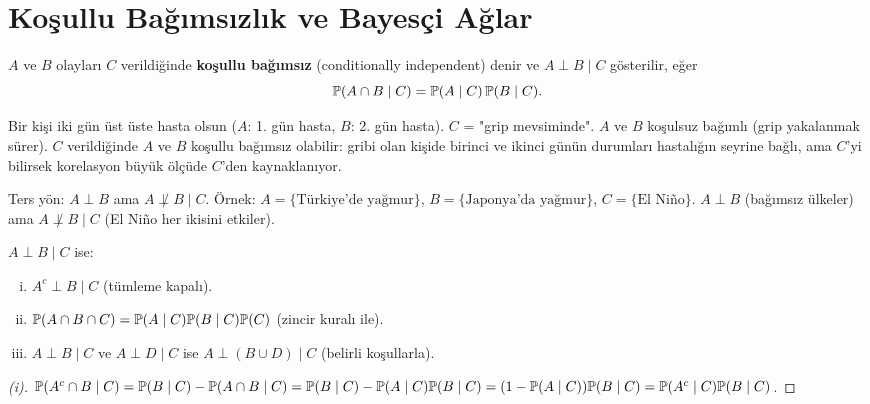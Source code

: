 \section{Koşullu Bağımsızlık ve Bayesçi Ağlar}
\label{sec:kosullu_bagimsizlik}

\begin{tanim}
\label{def:kosullu_bagimsizlik}
$A$ ve $B$ olayları $C$ verildiğinde \textbf{koşullu bağımsız}
(conditionally independent) denir ve $A \perp B \mid C$ gösterilir, eğer
\[
  \mathbb{P}(A \cap B \mid C) = \mathbb{P}(A \mid C)\,\mathbb{P}(B \mid C).
\]
\end{tanim}

\begin{ornek}
Bir kişi iki gün üst üste hasta olsun ($A$: 1. gün hasta, $B$: 2. gün hasta).
$C$ = "grip mevsiminde". $A$ ve $B$ koşulsuz bağımlı (grip yakalanmak sürer).
$C$ verildiğinde $A$ ve $B$ koşullu bağımsız olabilir: gribi olan kişide
birinci ve ikinci günün durumları hastalığın seyrine bağlı, ama $C$'yi bilirsek
korelasyon büyük ölçüde $C$'den kaynaklanıyor.

Ters yön: $A \perp B$ ama $A \not\perp B \mid C$.
Örnek: $A = \{\text{Türkiye'de yağmur}\}$, $B = \{\text{Japonya'da yağmur}\}$, $C = \{\text{El Niño}\}$.
$A \perp B$ (bağımsız ülkeler) ama $A \not\perp B \mid C$ (El Niño her ikisini etkiler).
\end{ornek}

\begin{teorem}
\label{thm:kosullu_bagimsizlik}
$A \perp B \mid C$ ise:
\begin{enumerate}[(i)]
  \item $A^c \perp B \mid C$ (tümleme kapalı).
  \item $\mathbb{P}(A \cap B \cap C) = \mathbb{P}(A \mid C)\mathbb{P}(B \mid C)\mathbb{P}(C)$ (zincir kuralı ile).
  \item $A \perp B \mid C$ ve $A \perp D \mid C$ ise $A \perp (B \cup D) \mid C$ (belirli koşullarla).
\end{enumerate}
\end{teorem}

\begin{proof}[(i)]
$\mathbb{P}(A^c \cap B \mid C) = \mathbb{P}(B \mid C) - \mathbb{P}(A \cap B \mid C)
= \mathbb{P}(B \mid C) - \mathbb{P}(A \mid C)\mathbb{P}(B \mid C) = (1-\mathbb{P}(A \mid C))\mathbb{P}(B \mid C)
= \mathbb{P}(A^c \mid C)\mathbb{P}(B \mid C)$.
\end{proof}

